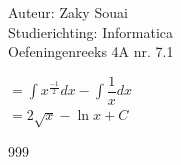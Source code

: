 \documentclass[a4paper]{article}
\begin{document}
  
\noindent \large Auteur: Zaky Souai \\
\noindent \large Studierichting:  Informatica\\
\noindent \large Oefeningenreeks 4A nr. 7.1\\

\bigskip

\normalsize

$ = \displaystyle\int  x^{\tfrac{-1}{2}} dx - \displaystyle\int \dfrac{1}{x} dx$\\

$ = 2\sqrt{x} - \ln x + C $\\

\begin{thebibliography}{999}
\end{thebibliography}
\end{document}
